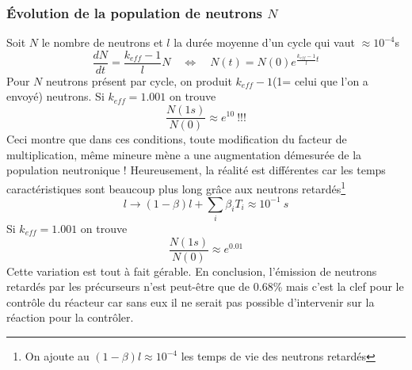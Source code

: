 \subsubsection{Évolution de la population de neutrons $N$}
Soit $N$ le nombre de neutrons et $l$ la durée moyenne d'un cycle qui vaut $\approx 10^{-4}$s
\begin{equation}
\frac{dN}{dt} = \dfrac{k_{eff}-1}{l}N\quad\Leftrightarrow\quad N(t)=N(0)e^{\frac{k_{eff}-1}{l}t}
\end{equation}
Pour $N$ neutrons présent par cycle, on produit $k_{eff}-1$(1= celui que l'on a envoyé) neutrons.
Si $k_{eff}=1.001$ on trouve
\begin{equation}
\frac{N(1s)}{N(0)} \approx e^{10}\ !!!
\end{equation}
Ceci montre que dans ces conditions, toute modification du facteur de multiplication, même
mineure mène a une augmentation démesurée de la population neutronique !
Heureusement, la réalité est différentes car les temps caractéristiques sont beaucoup plus long 
grâce aux neutrons retardés\footnote{On ajoute au $(1-\beta)l\approx 10^{-4}$ les temps de vie 
des neutrons retardés}
\begin{equation}
l \longrightarrow (1-\beta)l + \sum_i\beta_iT_i \approx 10^{-1}\ s
\end{equation}
Si $k_{eff}=1.001$ on trouve
\begin{equation}
\frac{N(1s)}{N(0)} \approx e^{0.01}
\end{equation}
Cette variation est tout à fait gérable. En conclusion, l'émission de neutrons retardés par les
précurseurs n'est peut-être que de 0.68\% mais c'est la clef pour le contrôle du réacteur car 
sans eux il ne serait pas possible d'intervenir sur la réaction pour la contrôler.
